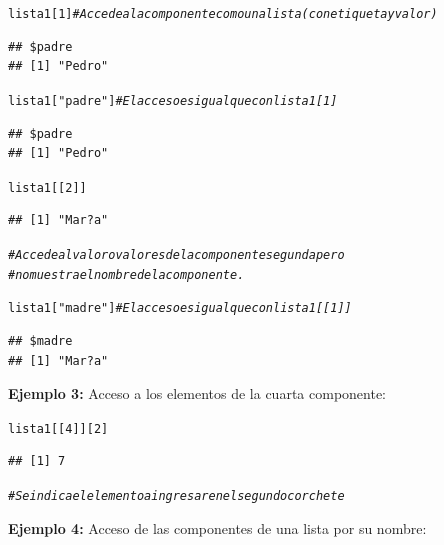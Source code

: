 \documentclass[12pt,letterpaper]{article}\usepackage[]{graphicx}\usepackage[]{color}
\makeatletter
\newcommand{\hlnum}[1]{\textcolor[rgb]{0.686,0.059,0.569}{#1}}%
\newcommand{\hlstr}[1]{\textcolor[rgb]{0.192,0.494,0.8}{#1}}%
\newcommand{\hlcom}[1]{\textcolor[rgb]{0.678,0.584,0.686}{\textit{#1}}}%
\newcommand{\hlstd}[1]{\textcolor[rgb]{0.345,0.345,0.345}{#1}}%
\newenvironment{kframe}{%
 \def\at@end@of@kframe{}%
 \ifinner\ifhmode%
  \def\at@end@of@kframe{\end{minipage}}%
  \begin{minipage}{\columnwidth}%
 \fi\fi%
 \def\FrameCommand##1{\hskip\@totalleftmargin \hskip-\fboxsep
 \colorbox{shadecolor}{##1}\hskip-\fboxsep
     \hskip-\linewidth \hskip-\@totalleftmargin \hskip\columnwidth}%
 \MakeFramed {\advance\hsize-\width
   \@totalleftmargin\z@ \linewidth\hsize
   \@setminipage}}%
 {\par\unskip\endMakeFramed%
 \at@end@of@kframe}
\newenvironment{knitrout}{}{} %
\makeatother
\begin{document}
\begin{knitrout}
\color{fgcolor}\begin{kframe}
\begin{alltt}
\hlstd{lista1[}\hlnum{1}\hlstd{]} \hlcom{# Accede a la componente como una lista (con etiqueta y valor)}
\end{alltt}
\begin{verbatim}
## $padre
## [1] "Pedro"
\end{verbatim}
\begin{alltt}
\hlstd{lista1[}\hlstr{"padre"}\hlstd{]} \hlcom{# El acceso es igual que con lista1[1]}
\end{alltt}
\begin{verbatim}
## $padre
## [1] "Pedro"
\end{verbatim}
\begin{alltt}
\hlstd{lista1[[}\hlnum{2}\hlstd{]]}
\end{alltt}
\begin{verbatim}
## [1] "Mar?a"
\end{verbatim}
\begin{alltt}
\hlcom{# Accede al valor o valores de la componente segunda pero }
\hlcom{# no muestra el nombre de la componente.}


\hlstd{lista1[}\hlstr{"madre"}\hlstd{]} \hlcom{# El acceso es igual que con lista1[[1]]}
\end{alltt}
\begin{verbatim}
## $madre
## [1] "Mar?a"
\end{verbatim}
\end{kframe}
\end{knitrout}
\textbf{Ejemplo 3:} Acceso a los elementos de la cuarta componente:
\begin{knitrout}
\color{fgcolor}\begin{kframe}
\begin{alltt}
\hlstd{lista1[[}\hlnum{4}\hlstd{]][}\hlnum{2}\hlstd{]}
\end{alltt}
\begin{verbatim}
## [1] 7
\end{verbatim}
\begin{alltt}
\hlcom{# Se indica el elemento a ingresar en el segundo corchete}
\end{alltt}
\end{kframe}
\end{knitrout}
\textbf{Ejemplo 4:} Acceso de las componentes de una lista por su nombre:
\end{document}
